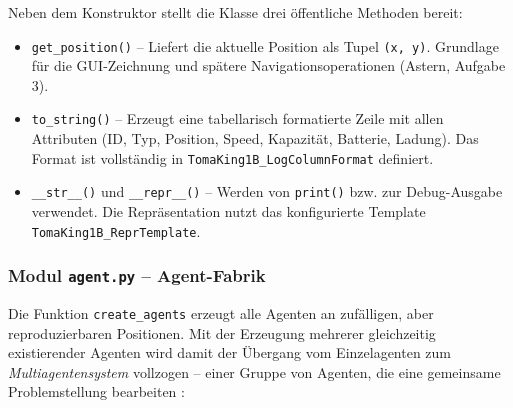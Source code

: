 Neben dem Konstruktor stellt die Klasse drei öffentliche Methoden bereit:
\begin{itemize}
    \item \texttt{get\_position()} – Liefert die aktuelle Position als Tupel \texttt{(x, y)}. Grundlage für die \acs{GUI}-Zeichnung und spätere Navigationsoperationen (\acs{Astern}, Aufgabe 3).
    \item \texttt{to\_string()} – Erzeugt eine tabellarisch formatierte Zeile mit allen Attributen (ID, Typ, Position, Speed, Kapazität, Batterie, Ladung). Das Format ist vollständig in \texttt{TomaKing1B\_LogColumnFormat} definiert.
    \item \texttt{\_\_str\_\_()} und \texttt{\_\_repr\_\_()} – Werden von \texttt{print()} bzw. zur Debug-Ausgabe verwendet. Die Repräsentation nutzt das konfigurierte Template \\ \texttt{TomaKing1B\_ReprTemplate}.
\end{itemize}


\subsubsection{Modul \texttt{agent.py} – Agent-Fabrik}

Die Funktion \texttt{create\_agents} erzeugt alle Agenten an zufälligen, aber reproduzierbaren Positionen. Mit der Erzeugung mehrerer gleichzeitig existierender Agenten wird damit der Übergang vom Einzelagenten zum \textit{Multiagentensystem} vollzogen -- einer Gruppe von Agenten, die eine gemeinsame Problemstellung bearbeiten \cite[S. 29\,f.]{5}:



